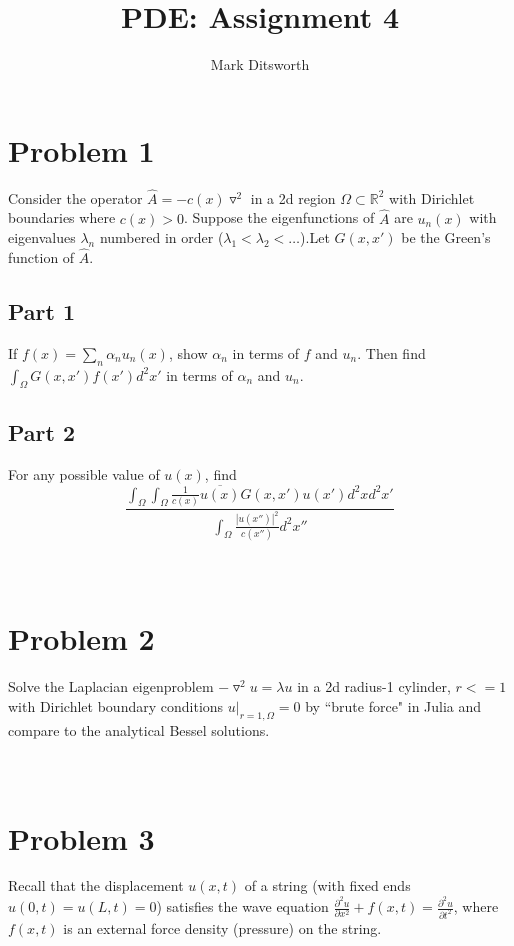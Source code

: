 \documentclass{amsart}
\title{PDE: Assignment 4}
\author{Mark Ditsworth}
\begin{document}
	\maketitle
	
	\section{Problem 1}
	Consider the operator $\hat{A} = -c(x)\triangledown^2$ in a 2d region $\Omega \subset \mathbb{R}^2$ with Dirichlet boundaries where $c(x) > 0$. Suppose the eigenfunctions of $\hat{A}$ are $u_n(x)$ with eigenvalues $\lambda_n$ numbered in order ($\lambda_1 < \lambda_2 <\dots$).Let $G(x,x')$ be the Green's function of $\hat{A}$.
	
	\subsection{Part 1}
	If $f(x) = \sum_{n}\alpha_n u_n(x)$, show $\alpha_n$ in terms of $f$ and $u_n$. Then find $\int_\Omega G(x,x')f(x')d^2x'$ in terms of $\alpha_n$ and $u_n$.
	\\
	\subsection{Part 2}
	For any possible value of $u(x)$, find
	\[
		\frac{\int_\Omega \int_\Omega \frac{1}{c(x)}\overline{u(x)}G(x,x')u(x')d^2xd^2x'}{\int_{\Omega} \frac{|u(x'')|^2}{c(x'')}d^2x''}
	\]
	\\\\
	\section{Problem 2}
	Solve the Laplacian eigenproblem $-\triangledown^2u = \lambda u$ in a 2d radius-1 cylinder, $r<=1$ with Dirichlet boundary conditions $u|_{r=1,\Omega} = 0$ by ``brute force" in Julia and compare to the analytical Bessel solutions.
	\\\\\\
	\section{Problem 3}
	Recall that the displacement $u(x,t)$ of a string (with fixed ends $u(0,t) = u(L,t) = 0$) satisfies the wave equation $\frac{\partial^2u}{\partial x^2} + f(x,t) = \frac{\partial^2u}{\partial t^2}$, where $f(x,t)$ is an external force density (pressure) on the string.
\end{document}
